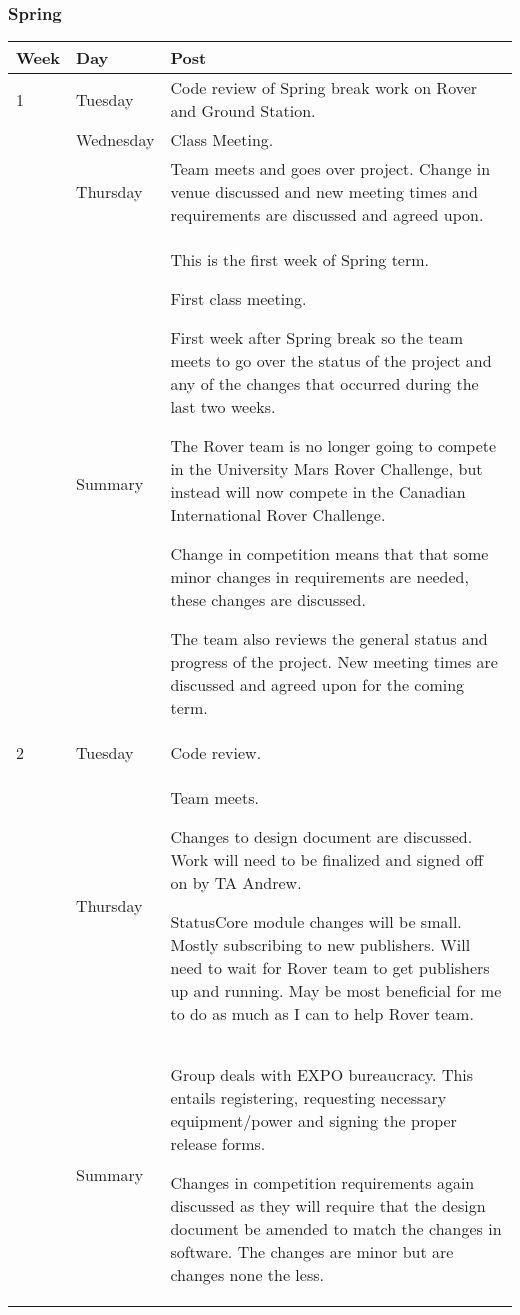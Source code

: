 \subsubsection{Spring}
\begin{longtable}{ | l | l | p{14cm} | }
\hline
Week & Day & Post \\
\hline
1 & Tuesday & Code review of Spring break work on Rover and Ground Station.\\
 & Wednesday & Class Meeting. \\
 & Thursday & Team meets and goes over project. Change in venue discussed and new meeting times and requirements are discussed and agreed upon. \\
\cline{2-3}
 & Summary & 
 This is the first week of Spring term. 

First class meeting.

First week after Spring break so the team meets to go over the status of the project and any of the changes that occurred during the last two weeks. 

The Rover team is no longer going to compete in the University Mars Rover Challenge, but instead will now compete in the Canadian International Rover Challenge.

Change in competition means that that some minor changes in requirements are needed, these changes are discussed. 

The team also reviews the general status and progress of the project. New meeting times are discussed and agreed upon for the coming term. 
\\
\hline
2 & Tuesday & Code review. \\
 & Thursday & 
Team meets. 

Changes to design document are discussed. Work will need to be finalized and signed off on by TA Andrew. 

StatusCore module changes will be small. Mostly subscribing to new publishers. Will need to wait for Rover team to get publishers up and running. May be most beneficial for me to do as much as I can to help Rover team. 
\\
\cline{2-3}
 & Summary & 
 Group deals with EXPO bureaucracy. This entails registering, requesting necessary equipment/power and signing the proper release forms. 

Changes in competition requirements again discussed as they will require that the design document be amended to match the changes in software. The changes are minor but are changes none the less. 


\end{longtable}
